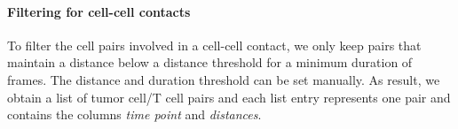 \documentclass{report}
\begin{document}
%                              

\paragraph{Filtering for cell-cell contacts}
To filter the cell pairs involved in a cell-cell contact, we only keep pairs that maintain a distance below a distance threshold for a minimum duration of frames. The distance and duration threshold can be set manually. As result, we obtain a list of tumor cell/T cell pairs and each list entry represents one pair and contains the columns \textit{time point} and \textit{distances}. 

%	
%
%
\end{document}
